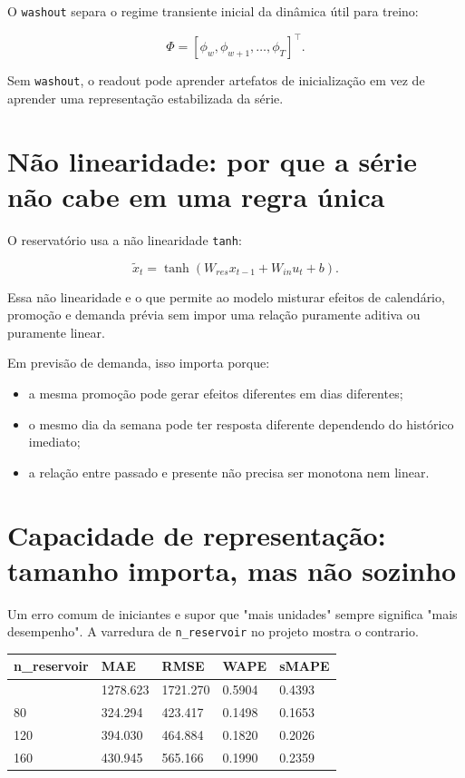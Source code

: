 \documentclass[12pt]{article}
\providecommand{\tightlist}{%
              \setlength{\itemsep}{0pt}\setlength{\parskip}{0pt}}
\begin{document}
O \texttt{washout} separa o regime transiente inicial da dinâmica útil para treino:

\[
\Phi = [\phi_w, \phi_{w+1}, \dots, \phi_T]^\top.
\]

Sem \texttt{washout}, o readout pode aprender artefatos de inicialização em vez de aprender uma representação estabilizada da série.

\section{Não linearidade: por que a série não cabe em uma regra única}\label{3-nuxe3o-linearidade-por-que-a-suxe9rie-nuxe3o-cabe-em-uma-regra-uxfanica}

O reservatório usa a não linearidade \texttt{tanh}:

\[
\widetilde{x}_t = \tanh(W_{res} x_{t-1} + W_{in} u_t + b).
\]

Essa não linearidade e o que permite ao modelo misturar efeitos de calendário, promoção e demanda prévia sem impor uma relação puramente aditiva ou puramente linear.

Em previsão de demanda, isso importa porque:

\begin{itemize}
\tightlist
\item
  a mesma promoção pode gerar efeitos diferentes em dias diferentes;
\item
  o mesmo dia da semana pode ter resposta diferente dependendo do histórico imediato;
\item
  a relação entre passado e presente não precisa ser monotona nem linear.
\end{itemize}

\section{Capacidade de representação: tamanho importa, mas não sozinho}\label{4-capacidade-de-representauxe7uxe3o-tamanho-importa-mas-nuxe3o-sozinho}

Um erro comum de iniciantes e supor que "mais unidades" sempre significa "mais desempenho". A varredura de \texttt{n\_reservoir} no projeto mostra o contrario.

\begin{longtable}[]{@{}lllll@{}}
\toprule\noalign{}
n\_reservoir & MAE & RMSE & WAPE & sMAPE \\
\midrule\noalign{}
\endhead
\bottomrule\noalign{}
\endlastfoot
40 & 1278.623 & 1721.270 & 0.5904 & 0.4393 \\
80 & 324.294 & 423.417 & 0.1498 & 0.1653 \\
120 & 394.030 & 464.884 & 0.1820 & 0.2026 \\
160 & 430.945 & 565.166 & 0.1990 & 0.2359 \\
\end{longtable}
\end{document}
